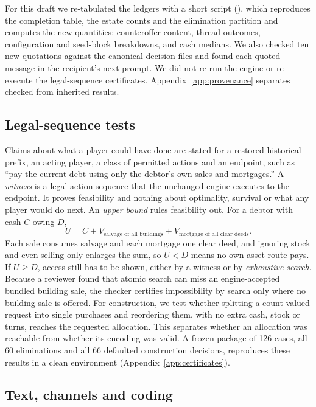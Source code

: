 For this draft we re-tabulated the ledgers with a short script (), which reproduces the completion table, the estate counts and the elimination partition and computes the new quantities: counteroffer content, thread outcomes, configuration and seed-block breakdowns, and cash medians. We also checked ten new quotations against the canonical decision files and found each quoted message in the recipient's next prompt. We did not re-run the engine or re-execute the legal-sequence certificates. Appendix~\ref{app:provenance} separates checked from inherited results.

\subsection{Legal-sequence tests}
\label{sec:legal-tests}

Claims about what a player could have done are stated for a restored historical prefix, an acting player, a class of permitted actions and an endpoint, such as ``pay the current debt using only the debtor's own sales and mortgages.'' A \emph{witness} is a legal action sequence that the unchanged engine executes to the endpoint. It proves feasibility and nothing about optimality, survival or what any player would do next. An \emph{upper bound} rules feasibility out. For a debtor with cash $C$ owing $D$,
\begin{equation}
U = C + V_{\text{salvage of all buildings}} + V_{\text{mortgage of all clear deeds}}.
\label{eq:upper}
\end{equation}
Each sale consumes salvage and each mortgage one clear deed, and ignoring stock and even-selling only enlarges the sum, so $U<D$ means no own-asset route pays. If $U\ge D$, access still has to be shown, either by a witness or by \emph{exhaustive search}. Because a reviewer found that atomic search can miss an engine-accepted bundled building sale, the checker certifies impossibility by search only where no building sale is offered. For construction, we test whether splitting a count-valued request into single purchases and reordering them, with no extra cash, stock or turns, reaches the requested allocation. This separates whether an allocation was reachable from whether its encoding was valid. A frozen package of 126 cases, all 60 eliminations and all 66 defaulted construction decisions, reproduces these results in a clean environment (Appendix~\ref{app:certificates}).

\subsection{Text, channels and coding}
\label{sec:coding}

